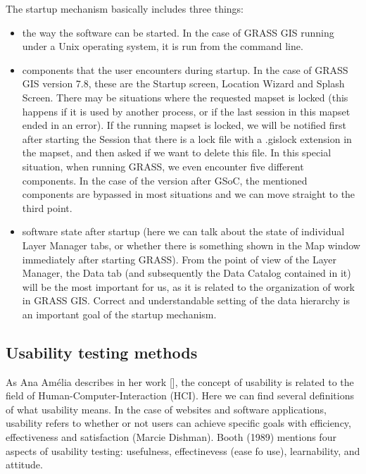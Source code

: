 \documentclass[a4paper,10pt,twoside]{article}
\begin{document}
\noindent The startup mechanism basically includes three things:

\begin {itemize}

\item the way the software can be started. In the case of GRASS GIS running under a Unix operating system, it is run from the command line.

\item components that the user encounters during startup. In the case of GRASS GIS version 7.8, these are the Startup screen, Location Wizard and Splash Screen. There may be situations where the requested mapset is locked (this happens if it is used by another process, or if the last session in this mapset ended in an error). If the running mapset is locked, we will be notified first after starting the Session that there is a lock file with a .gislock extension in the mapset, and then asked if we want to delete this file. In this special situation, when running GRASS, we even encounter five different components.
In the case of the version after GSoC, the mentioned components are bypassed in most situations and we can move straight to the third point.

\item software state after startup (here we can talk about the state of individual Layer Manager tabs, or whether there is something shown in the Map window immediately after starting GRASS). From the point of view of the Layer Manager, the Data tab (and subsequently the Data Catalog contained in it) will be the most important for us, as it is related to the organization of work in GRASS GIS. Correct and understandable setting of the data hierarchy is an important goal of the startup mechanism.

\end{itemize}

\newpage
\vspace*{-1cm}
\subsection{Usability testing methods}

\noindent As Ana Amélia describes in her work [], the concept of usability is related to the field of Human-Computer-Interaction (HCI). Here we can find several definitions of what usability means. In the case of websites and software applications, usability refers to whether or not users can achieve specific goals with efficiency, effectiveness and satisfaction (Marcie Dishman). Booth (1989) mentions four aspects of usability testing: usefulness, effectinevess (ease fo use), learnability, and attitude.
\end{document}
